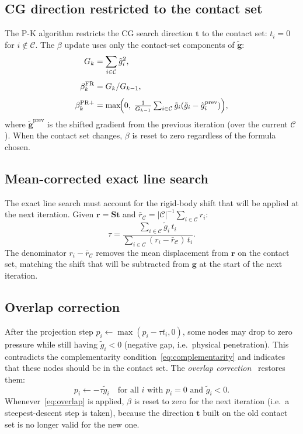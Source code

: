\documentclass[11pt,a4paper]{article}
\newcommand{\bS}{\mathbf{S}}
\newcommand{\bg}{\mathbf{g}}
\newcommand{\br}{\mathbf{r}}
\newcommand{\bt}{\mathbf{t}}
\newcommand{\calC}{\mathcal{C}}
\begin{document}
\subsection{CG direction restricted to the contact set}

The P-K algorithm restricts the CG search direction $\bt$ to the contact set:
$t_i = 0$ for $i \notin \calC$.  The $\beta$ update uses only the contact-set
components of $\tilde{\bg}$:
\begin{align}
  G_k &= \sum_{i \in \calC} \tilde g_i^2, \label{eq:Gk}\\[4pt]
  \beta_k^{\mathrm{FR}}  &= G_k / G_{k-1}, \label{eq:beta-fr-pk}\\[4pt]
  \beta_k^{\mathrm{PR+}} &= \max\!\Bigl(0,\;
     \tfrac{1}{G_{k-1}}\textstyle\sum_{i\in\calC}\tilde g_i(\tilde g_i - \tilde g_i^{\mathrm{prev}})\Bigr),
  \label{eq:beta-pr-pk}
\end{align}
where $\tilde{\bg}^{\mathrm{prev}}$ is the shifted gradient from the previous
iteration (over the current $\calC$).  When the contact set changes,
$\beta$ is reset to zero regardless of the formula chosen.

\subsection{Mean-corrected exact line search}

The exact line search must account for the rigid-body shift that will be applied
at the next iteration.  Given $\br = \bS\bt$ and $\bar r_\calC = |\calC|^{-1}\sum_{i\in\calC}r_i$:
\begin{equation}
  \tau = \frac{\sum_{i\in\calC}\tilde g_i\, t_i}
              {\sum_{i\in\calC}(r_i - \bar r_\calC)\, t_i}.
  \label{eq:tau}
\end{equation}
The denominator $r_i - \bar r_\calC$ removes the mean displacement from $\br$
on the contact set, matching the shift that will be subtracted from $\bg$ at the
start of the next iteration.

\subsection{Overlap correction}

After the projection step $p_i \leftarrow \max(p_i - \tau t_i, 0)$,
some nodes may drop to zero pressure while still having $\tilde g_i < 0$
(negative gap, i.e.\ physical penetration).
This contradicts the complementarity condition~\eqref{eq:complementarity}
and indicates that these nodes should be in the contact set.
The \emph{overlap correction}~\cite{PolKeer1999} restores them:
\begin{equation}
  p_i \leftarrow -\tau\tilde g_i \quad
  \text{for all } i \text{ with } p_i = 0 \text{ and } \tilde g_i < 0.
  \label{eq:overlap}
\end{equation}
Whenever~\eqref{eq:overlap} is applied, $\beta$ is reset to zero for the next
iteration (i.e.\ a steepest-descent step is taken), because the direction $\bt$
built on the old contact set is no longer valid for the new one.
\end{document}
